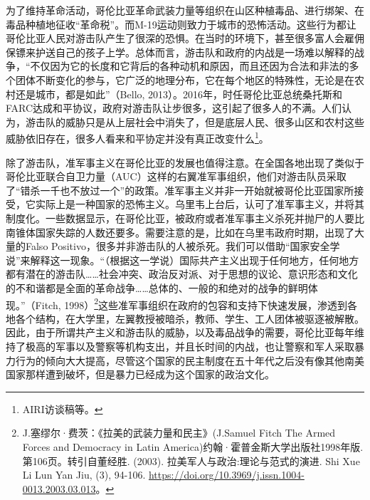 \documentclass{phyasgn}\usepackage{nag}
\begin{document}
\par 为了维持革命活动，哥伦比亚革命武装力量等组织在山区种植毒品、进行绑架、在毒品种植地征收“革命税”。而M-19运动则致力于城市的恐怖活动。这些行为都让哥伦比亚人民对游击队产生了很深的恐惧。在当时的环境下，甚至很多富人会雇佣保镖来护送自己的孩子上学。总体而言，游击队和政府的内战是一场难以解释的战争，“不仅因为它的长度和它背后的各种动机和原因，而且还因为合法和非法的多个团体不断变化的参与，它广泛的地理分布，它在每个地区的特殊性，无论是在农村还是城市，都是如此”（Bello, 2013）。2016年，时任哥伦比亚总统桑托斯和FARC达成和平协议，政府对游击队让步很多，这引起了很多人的不满。人们认为，游击队的威胁只是从上层社会中消失了，但是底层人民、很多山区和农村这些威胁依旧存在，很多人看来和平协定并没有真正改变什么\footnote[2]{AIRI访谈稿等。}。
\par 除了游击队，准军事主义在哥伦比亚的发展也值得注意。在全国各地出现了类似于哥伦比亚联合自卫力量（AUC）这样的右翼准军事组织，他们对游击队员采取了“错杀一千也不放过一个”的政策。准军事主义并非一开始就被哥伦比亚国家所接受，它实际上是一种国家的恐怖主义。乌里韦上台后，认可了准军事主义，并将其制度化。一些数据显示，在哥伦比亚，被政府或者准军事主义杀死并抛尸的人要比南锥体国家失踪的人数还要多。需要注意的是，比如在乌里韦政府时期，出现了大量的Falso Positivo，很多并非游击队的人被杀死。我们可以借助“国家安全学说”来解释这一现象。“（根据这一学说）国际共产主义出现于任何地方，任何地方都有潜在的游击队……社会冲突、政治反对派、对于思想的议论、意识形态和文化的不和谐都是全面的革命战争……总体的、一般的和绝对的战争的鲜明体现。”（Fitch, 1998）\footnote[3]{J.塞缪尔·费茨：《拉美的武装力量和民主》(J.Samuel Fitch The Armed Forces and Democracy in Latin America)约翰·霍普金斯大学出版社1998年版. 第106页。转引自董经胜. (2003). 拉美军人与政治:理论与范式的演进. Shi Xue Li Lun Yan Jiu, (3), 94-106. \url{https://doi.org/10.3969/j.issn.1004-0013.2003.03.013}。}这些准军事组织在政府的包容和支持下快速发展，渗透到各地各个结构，在大学里，左翼教授被暗杀，教师、学生、工人团体被驱逐被解散。因此，由于所谓共产主义和游击队的威胁，以及毒品战争的需要，哥伦比亚每年维持了极高的军事以及警察等机构支出，并且长时间的内战，也让警察和军人采取暴力行为的倾向大大提高，尽管这个国家的民主制度在五十年代之后没有像其他南美国家那样遭到破坏，但是暴力已经成为这个国家的政治文化。
\end{document}
